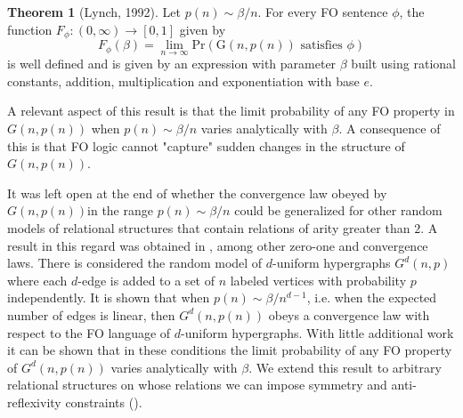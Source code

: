 \documentclass[12pt,notitlepage,a4paper]{article}
\theoremstyle{definition}
\newtheorem*{theorem*}{Theorem}
\newcommand{\Ln}{\lim\limits_{n\to \infty}}
\begin{document}
\begin{theorem*}[Lynch, 1992]
	Let $p(n)\sim \beta/n$. For every FO sentence $\phi$, the function
	$F_\phi: (0,\infty)\rightarrow [0,1]$ given by 
	\[ F_\phi(\beta) = \Ln \mathrm{Pr}\left( \mathrm{G}(n,p(n))
	\text{ satisfies } \phi   \right) \]
	is well defined and is given by an expression with parameter $\beta$ built
	using rational constants, addition, multiplication and exponentiation with base $e$.
\end{theorem*}

A relevant aspect of this result is that the limit probability of any FO
property in $G(n,p(n))$ when $p(n)\sim \beta/n$ varies analytically with $\beta$.
A consequence of this is that FO logic cannot "capture" sudden changes 
in the structure of $G(n,p(n))$. \par
It was left open at the end of \cite{lynch1992probabilities} whether the convergence law obeyed
by $G(n,p(n))$in the range $p(n)\sim \beta/n$
could be generalized for other random models of relational structures 
that contain relations of arity greater than $2$.
A result in this regard was obtained in \cite{salvadorbrasil}, 
among other zero-one and convergence laws.
There is considered the random model of $d$-uniform hypergraphs $G^d(n,p)$ where
each $d$-edge is added to a set of $n$ labeled vertices with probability $p$ independently.
It is shown that when $p(n)\sim \beta/n^{d-1}$, i.e. when the expected number of
edges is linear, then $G^d(n,p(n))$ obeys a convergence law with respect to the FO
language of $d$-uniform hypergraphs. With little additional work it can be shown that
in these conditions the limit probability of any FO property of $G^d(n,p(n))$ varies 
analytically with $\beta$. We 
extend this result to arbitrary relational structures
on whose relations we can impose symmetry and anti-reflexivity constraints 
(). \par
\end{document}
